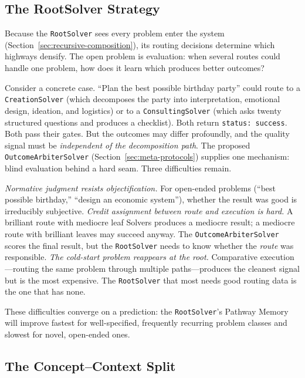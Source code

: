 \documentclass[11pt]{article}
\let\oldtexttt\texttt
\renewcommand{\texttt}[1]{\oldtexttt{\small #1}}
\begin{document}
\subsection{The RootSolver Strategy}
\label{sec:root-strategy}

Because the \texttt{RootSolver} sees every problem enter the system (Section~\ref{sec:recursive-composition}), its routing decisions determine which highways densify. The open problem is evaluation: when several routes could handle one problem, how does it learn which produces better outcomes?

Consider a concrete case. ``Plan the best possible birthday party'' could route to a \texttt{CreationSolver} (which decomposes the party into interpretation, emotional design, ideation, and logistics) or to a \texttt{ConsultingSolver} (which asks twenty structured questions and produces a checklist). Both return \texttt{status: success}. Both pass their gates. But the outcomes may differ profoundly, and the quality signal must be \emph{independent of the decomposition path}. The proposed \texttt{OutcomeArbiterSolver} (Section~\ref{sec:meta-protocols}) supplies one mechanism: blind evaluation behind a hard seam. Three difficulties remain.

\emph{Normative judgment resists objectification.} For open-ended problems (``best possible birthday,'' ``design an economic system''), whether the result was good is irreducibly subjective. \emph{Credit assignment between route and execution is hard.} A brilliant route with mediocre leaf Solvers produces a mediocre result; a mediocre route with brilliant leaves may succeed anyway. The \texttt{OutcomeArbiterSolver} scores the final result, but the \texttt{RootSolver} needs to know whether the \emph{route} was responsible. \emph{The cold-start problem reappears at the root.} Comparative execution---routing the same problem through multiple paths---produces the cleanest signal but is the most expensive. The \texttt{RootSolver} that most needs good routing data is the one that has none.

These difficulties converge on a prediction: the \texttt{RootSolver}'s Pathway Memory will improve fastest for well-specified, frequently recurring problem classes and slowest for novel, open-ended ones.

\subsection{The Concept--Context Split}
\label{sec:concept-context}
\end{document}
